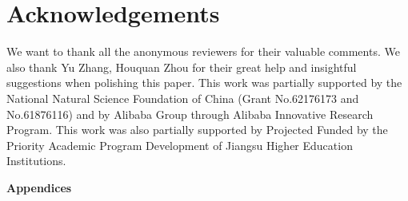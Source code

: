 \documentclass[11pt]{article}
\begin{document}
\section*{Acknowledgements}
We want to thank all the anonymous reviewers for their valuable comments. We also thank Yu Zhang, Houquan Zhou for their great help and insightful suggestions when polishing this paper. This work was partially supported by the National Natural Science Foundation of China (Grant No.62176173 and No.61876116) and by Alibaba Group through Alibaba Innovative  Research Program. This work was also partially supported by Projected Funded by the Priority Academic Program Development of Jiangsu Higher Education Institutions.



 





\appendix








\vspace{+1ex}
\begin{center}
\Large \textbf{Appendices} 
\end{center}

\vspace{+1ex}
\end{document}
